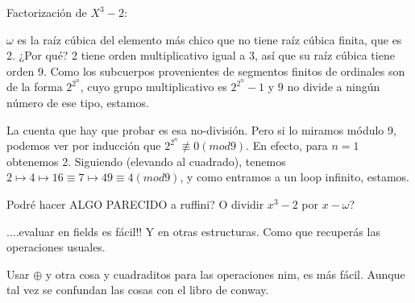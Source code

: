 \documentclass[10pt,a4paper,final]{report}
\begin{document}
\begin{frame}
	Factorización de $X^3 - 2$:
	
	$\omega$ es la raíz cúbica del elemento más chico que no tiene raíz cúbica finita, que es 2. ¿Por qué? 2 tiene orden multiplicativo igual a 3, así que su raíz cúbica tiene orden 9. Como los subcuerpos provenientes de segmentos finitos de ordinales son de la forma $2^{2^n}$, cuyo grupo multiplicativo es $2^{2^n}-1$ y $9$ no divide a ningún número de ese tipo, estamos.
	
	La cuenta que hay que probar es esa no-división. Pero si lo miramos módulo 9, podemos ver por inducción que $2^{2^n} \not\equiv 0 (mod 9)$. En efecto, para $n=1$ obtenemos 2. Siguiendo (elevando al cuadrado), tenemos $2 \mapsto 4 \mapsto 16 \equiv 7 \mapsto 49 \equiv 4 (mod 9)$, y como entramos a un loop infinito, estamos.
	
	Podré hacer ALGO PARECIDO a ruffini? O dividir $x^3-2$ por $x-\omega$?
	
	
	....evaluar en fields es fácil!! Y en otras estructuras. Como que recuperás  las operaciones usuales.
	
	Usar $\oplus$ y otra cosa y cuadraditos para las operaciones nim, es más fácil. Aunque tal vez se confundan las cosas con el libro de conway.
\end{frame}
\end{document}
